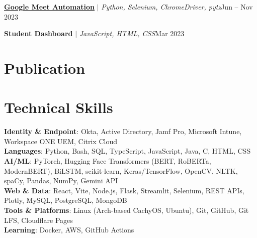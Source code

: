 \documentclass[a4paper]{article}
\begin{document}
      \resumeProjectHeading
        {\href{https://github.com/ep0chzero/google_meet_automation}{\textbf{Google Meet Automation}} $|$ \emph{Python, Selenium, ChromeDriver, pytz}}{Jun -- Nov 2023}
      \resumeItemListStart
      \resumeItemListEnd

      \resumeProjectHeading
        {\textbf{Student Dashboard} $|$ \emph{JavaScript, HTML, CSS}}{Mar 2023}
      \resumeItemListStart
      \resumeItemListEnd
    \resumeSubHeadingListEnd
\vspace{-4pt}

\section{Publication}
\begin{resumeBlock}
\pubMediSense
\end{resumeBlock}
\vspace{-6pt}

\section{Technical Skills}
\begin{resumeBlock}
\textbf{Identity \& Endpoint}{: Okta, Active Directory, Jamf Pro, Microsoft Intune, Workspace ONE UEM, Citrix Cloud} \\
\textbf{Languages}{: Python, Bash, SQL, TypeScript, JavaScript, Java, C, HTML, CSS} \\
\textbf{AI/ML}{: PyTorch, Hugging Face Transformers (BERT, RoBERTa, ModernBERT), BiLSTM, scikit-learn, Keras/TensorFlow, OpenCV, NLTK, spaCy, Pandas, NumPy, Gemini API} \\
\textbf{Web \& Data}{: React, Vite, Node.js, Flask, Streamlit, Selenium, REST APIs, Plotly, MySQL, PostgreSQL, MongoDB} \\
\textbf{Tools \& Platforms}{: Linux (Arch-based CachyOS, Ubuntu), Git, GitHub, Git LFS, Cloudflare Pages} \\
\textbf{Learning}{: Docker, AWS, GitHub Actions}
\end{resumeBlock}
\vspace{-6pt}
\end{document}
